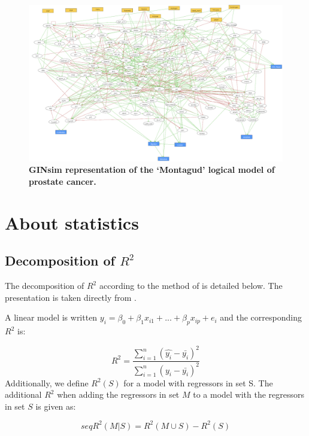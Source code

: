 \documentclass[a4paper,12pt,twoside,onecolumn,openright,final,oldfontcommands]{memoir}
\begin{document}
\begin{figure}

{\centering \includegraphics[width=0.9\linewidth]{fig/Montagud} 

}

\caption[GINsim representation of the "Montagud" logical model of prostate cancer]{\textbf{GINsim representation of the `Montagud'
logical model of prostate cancer.}}\label{fig:Montagud}
\end{figure}




\chapter{About statistics}\label{about-statistics}

\section{\texorpdfstring{Decomposition of
\(R^2\)}{Decomposition of R\^{}2}}\label{appendix-decomp}

The decomposition of \(R^2\) according to the method of
\citet{lindeman1980introduction} is detailed below. The presentation is
taken directly from \citet{gromping2006relative}.

A linear model is written
\(y_i=\beta_0+\beta_1x_{i1}+...+\beta_px_{ip}+e_i\) and the
corresponding \(R^2\) is:

\[R^2=\dfrac{\sum_{i=1}^{n} (\hat{y_i}-\bar{y_i})^2}{\sum_{i=1}^{n}  (y_i-\bar{y_i})^2}\]
Additionally, we define \(R^2(S)\) for a model with regressors in set S.
The additional \(R^2\) when adding the regressors in set \(M\) to a
model with the regressors in set \(S\) is given as:

\[seqR^2(M|S)=R^2(M\cup S)-R^2(S)\]
\end{document}
